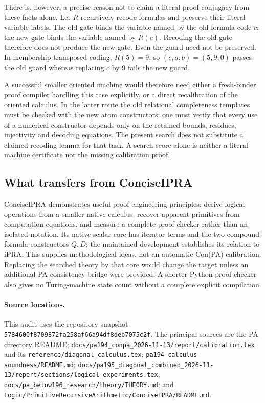There is, however, a precise reason not to claim a literal proof conjugacy
from these facts alone. Let $R$ recursively recode formulas and preserve
their literal variable labels. The old gate binds the variable named by
the old formula code $c$; the new gate binds the variable named by $R(c)$.
Recoding the old gate therefore does not produce the new gate. Even the
guard need not be preserved. In membership-transposed coding,
$R(5)=9$, so $(c,a,b)=(5,9,0)$ passes the old guard whereas replacing
$c$ by $9$ fails the new guard.

A successful smaller oriented machine would therefore need either a
fresh-binder proof compiler handling this case explicitly, or a direct
recalibration of the oriented calculus. In the latter route the old
relational completeness templates must be checked with the new atom
constructors; one must verify that every use of a numerical constructor
depends only on the retained bounds, residues, injectivity and decoding
equations. The present search does not substitute a claimed recoding
lemma for that task. A search score alone is neither a literal machine
certificate nor the missing calibration proof.

\subsection{What transfers from ConciseIPRA}

ConciseIPRA demonstrates useful proof-engineering principles: derive
logical operations from a smaller native calculus, recover apparent
primitives from computation equations, and measure a complete proof checker
rather than an isolated notation. Its native scalar core has iterator
terms and the two compound formula constructors $Q,D$; the maintained
development establishes its relation to iPRA. This supplies methodological
ideas, not an automatic Con(PA) calibration. Replacing the searched theory
by that core would change the target unless an additional PA consistency
bridge were provided. A shorter Python proof checker also gives no
Turing-machine state count without a complete explicit compilation.

\paragraph{Source locations.}
This audit uses the repository snapshot
\texttt{5784600f8709872fa258af66a94df8deb7075c2f}.
The principal sources are the PA directory README;
\texttt{docs/pa194\_conpa\_2026-11-13/report/calibration.tex} and its
\texttt{reference/diagonal\_calculus.tex};
\texttt{pa194-calculus-soundness/README.md};
\texttt{docs/pa195\_diagonal\_combined\_2026-11-13/report/sections/logical\_experiments.tex};
\texttt{docs/pa\_below196\_research/theory/THEORY.md};
and \texttt{Logic/PrimitiveRecursiveArithmetic/ConciseIPRA/README.md}.
